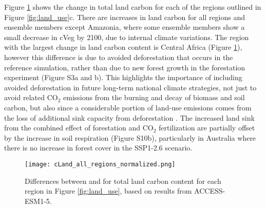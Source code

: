 \documentclass[draft]{agujournal2019}
\begin{document}
Figure \ref{fig:accesss_regional_cland} shows the change in total land carbon for each of the regions outlined in Figure \ref{fig:land_use}c.
There are increases in land carbon for all regions and ensemble members except Amazonia, where some ensemble members show a small decrease in cVeg by 2100, due to internal climate variations.
The region with the largest change in land carbon content is Central Africa (Figure \ref{fig:accesss_regional_cland}), however this difference is due to avoided deforestation that occurs in the reference simulation, rather than due to new forest growth in the forestation experiment (Figure S3a and b).
This highlights the importance of including avoided deforestation in future long-term national climate strategies, not just to avoid related CO$_2$ emissions from the burning and decay of biomass and soil carbon, but also since a considerable portion of land-use emissions comes from the loss of additional sink capacity from deforestation \cite{gitz_amplifying_2003, pongratz_terminology_2014, obermeier_modelled_2021}.
The increased land sink from the combined effect of forestation and CO$_2$ fertilization are partially offset by the increase in soil respiration (Figure S10b), particularly in Australia where there is no increase in forest cover in the SSP1-2.6 scenario.


\begin{figure}
    \texttt{[image: cLand\_all\_regions\_normalized.png]}
    \caption{Differences between  and  for  total land carbon content for each region in Figure \ref{fig:land_use}, based on results from ACCESS-ESM1-5. }
    \label{fig:accesss_regional_cland}
\end{figure}
\end{document}
